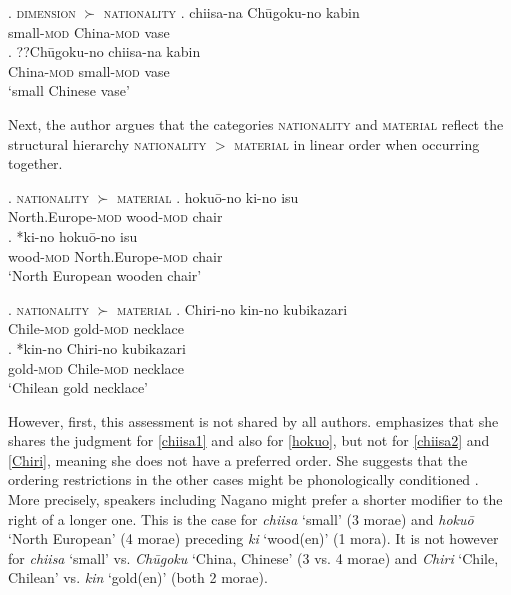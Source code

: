 \ex. \textsc{dimension} $\succ$ \textsc{nationality}
\label{chiisa2} \ag. chiisa-na Chūgoku-no kabin\\
small-\textsc{mod} China-\textsc{mod} vase\\
\bg. ??Chūgoku-no chiisa-na kabin\\
China-\textsc{mod} small-\textsc{mod} vase\\
`small Chinese vase' \hfill \citep[507]{watanabe:2012:direct}

Next, the author argues that the categories \textsc{nationality} and \textsc{material} reflect the structural hierarchy \textsc{nationality} $>$ \textsc{material} in linear order when occurring together.

\largerpage
\ex. \textsc{nationality} $\succ$ \textsc{material}
\label{hokuo} \ag. hokuō-no ki-no isu \\
North.Europe-\textsc{mod} wood-\textsc{mod} chair\\
\bg. *ki-no hokuō-no isu\\
wood-\textsc{mod} North.Europe-\textsc{mod} chair\\
`North European wooden chair' \hfill \citep[508]{watanabe:2012:direct}

\ex. \textsc{nationality} $\succ$ \textsc{material}
\label{Chiri} \ag. Chiri-no kin-no kubikazari\\
Chile-\textsc{mod} gold-\textsc{mod} necklace\\
\bg. *kin-no Chiri-no kubikazari\\
gold-\textsc{mod} Chile-\textsc{mod} necklace\\
`Chilean gold necklace' \hfill \citep[508]{watanabe:2012:direct}

However, first, this assessment is not shared by all authors. \citet[Footnote 14]{nagano:2016:are} emphasizes that she shares the judgment for \ref{chiisa1} and also for \ref{hokuo}, but not for \ref{chiisa2} and \ref{Chiri}, meaning she does not have a preferred order. She suggests that the ordering restrictions in the other cases might be phonologically conditioned \citep[Footnote 14]{nagano:2016:are}. More precisely, speakers including Nagano might prefer a shorter modifier to the right of a longer one. This is the case for \textit{chiisa} `small' (3 morae) and \textit{hokuō} `North European' (4 morae) preceding \textit{ki} `wood(en)' (1 mora). It is not however for \textit{chiisa} `small' vs. \textit{Chūgoku} `China, Chinese' (3 vs. 4 morae) and \textit{Chiri} `Chile, Chilean' vs. \textit{kin} `gold(en)' (both 2 morae).

